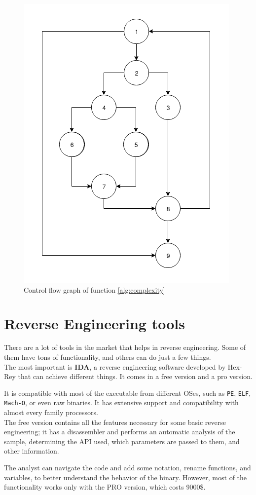 \begin{figure}[!h]
	\centering
	\includegraphics[width=0.6\columnwidth]{complexity.png}
	\caption{Control flow graph of function \ref{alg:complexity}}
	\label{fig:complexity_ex}
\end{figure}


\section{Reverse Engineering tools}

There are a lot of tools in the market that helps in reverse engineering. Some of them have tons of functionality, and others can do just a few things.\\

The most important is \textbf{IDA}, a reverse engineering software developed by Hex-Rey that can achieve different things. It comes in a free version and a pro version. 

It is compatible with most of the executable from different OSes, such as \texttt{PE}, \texttt{ELF}, \texttt{Mach-O}, or even raw binaries. It has extensive support and compatibility with almost every family processors.\\

The free version contains all the features necessary for some basic reverse engineering; it has a disassembler and performs an automatic analysis of the sample, determining the API used, which parameters are passed to them, and other information. 

The analyst can navigate the code and add some notation, rename functions, and variables, to better understand the behavior of the binary. However, most of the functionality works only with the PRO version, which costs 9000\$.

